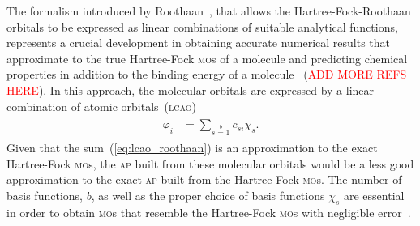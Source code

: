 The formalism introduced by Roothaan~\cite{Roothaan_HF}, that allows
the Hartree-Fock-Roothaan orbitals to be expressed as linear
combinations of suitable analytical functions, represents a crucial
development in obtaining accurate numerical results that approximate
to the true Hartree-Fock \textsc{mo}s of a molecule and predicting
chemical properties in addition to the binding energy of a
molecule~\cite{scf_lc_1967,EllisonShullh2o_1955} (\textcolor{red}{ADD
  MORE REFS HERE}). In this approach, the molecular orbitals are
expressed by a linear combination of atomic
orbitals~(\textsc{lcao})~\cite{Roothaan_HF}
%
\begin{eqnarray}
  \begin{split}
    \varphi_{i} & = \sum\limits_{s=1}\limits^{b} c_{si} \chi_{s}.
  \end{split}
  \label{eq:lcao_roothaan}
\end{eqnarray}
%
Given that the sum~(\ref{eq:lcao_roothaan}) is an approximation to the
exact Hartree-Fock \textsc{mo}s, the \textsc{ap} built from these
molecular orbitals would be a less good approximation to the exact
\textsc{ap} built from the Hartree-Fock \textsc{mo}s. The number of
basis functions, $b$, as well as the proper choice of basis functions
$\chi_{s}$ are essential in order to obtain \textsc{mo}s that resemble
the Hartree-Fock \textsc{mo}s with negligible
error~\cite{Moccia_JCP_2164,Moccia_JCP_2176,Moccia_1964}.

